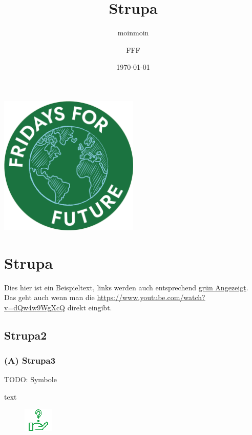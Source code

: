 \documentclass[a4paper,
  ]{scrartcl}
\author{FFF}
\title{Strupa}
\subtitle{moinmoin}
\date{\today}
\begin{document}
\begin{center}
    \includegraphics[width=0.5\textwidth]{Logo.png}
\end{center}




\tableofcontents

\section{Strupa}
Dies hier ist ein Beispieltext, links werden auch entsprechend \href{https://www.youtube.com/watch?v=dQw4w9WgXcQ}{grün Angezeigt}. Das geht auch wenn man die \url{https://www.youtube.com/watch?v=dQw4w9WgXcQ} direkt eingibt.
\subsection{Strupa2}
\subsubsection*{ (A) Strupa3}

TODO: Symbole

text

\begin{figure}
    \includegraphics[scale=1.8]{Fragezeichen-Hand.png}
\end{figure}
\end{document}

